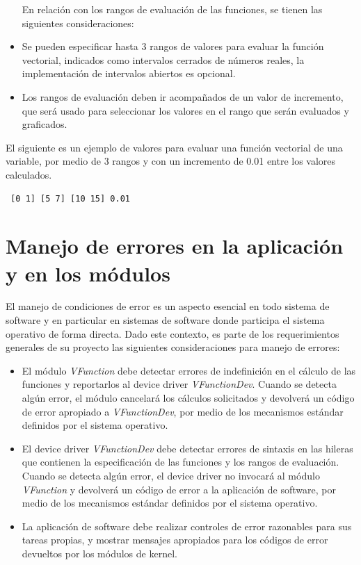 \documentclass[12pt,letterpaper]{article}
\begin{document}
\begin{itemize}
En relación con los rangos de evaluación de las funciones, se tienen las siguientes consideraciones:
\item Se pueden especificar hasta 3 rangos de valores para evaluar la función vectorial, indicados como intervalos cerrados de números reales, la implementación de intervalos abiertos es opcional.
\item Los rangos de evaluación deben ir acompañados de un valor de incremento, que será usado para seleccionar los valores en el rango que serán evaluados y graficados.
\end{itemize}
El siguiente es un ejemplo de valores para evaluar una función vectorial de una variable, por medio de 3 rangos y con un incremento de 0.01 entre los valores calculados.
\begin{verbatim}
 [0 1] [5 7] [10 15] 0.01
\end{verbatim} 

\section*{Manejo de errores en la aplicación y en los módulos}

El manejo de condiciones de error es un aspecto esencial en todo sistema de software y en particular en sistemas de software donde participa el sistema operativo de forma directa. Dado este contexto, es parte de los requerimientos generales de su proyecto las siguientes consideraciones para manejo de errores:
\begin{itemize}
 \item El módulo \textit{VFunction} debe detectar errores de indefinición en el cálculo de las funciones y reportarlos al device driver \textit{VFunctionDev}. Cuando se detecta algún error, el módulo cancelará los cálculos solicitados y devolverá un código de error apropiado a \textit{VFunctionDev}, por medio de los mecanismos estándar definidos por el sistema operativo.
 \item El device driver \textit{VFunctionDev} debe detectar errores de sintaxis en las hileras que contienen la especificación de las funciones y los rangos de evaluación.  Cuando se detecta algún error, el device driver no invocará al módulo \textit{VFunction} y devolverá un código de error a la aplicación de software, por medio de los mecanismos estándar definidos por el sistema operativo.
 \item La aplicación de software debe realizar controles de error razonables para sus tareas propias, y mostrar mensajes apropiados para los códigos de error devueltos por los módulos de kernel.
\end{itemize}
\end{document}
